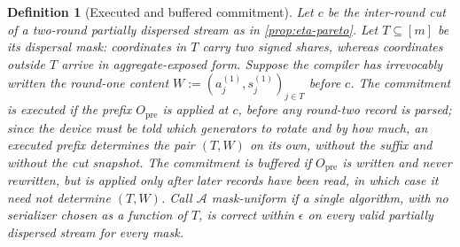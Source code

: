 \documentclass[a4paper,twocolumn,10pt,unpublished]{quantumarticle}
\newtheorem{definition}{Definition}
\begin{document}
\begin{definition}[Executed and buffered commitment]
\label{def:self-identifying}
Let $c$ be the inter-round cut of a two-round partially dispersed stream
as in \cref{prop:eta-pareto}.  Let $T\subseteq[m]$ be its dispersal mask:
coordinates in $T$ carry two signed shares, whereas coordinates outside
$T$ arrive in aggregate-exposed form.  Suppose the compiler has
irrevocably written the round-one content
$W:=(a^{(1)}_j,s^{(1)}_j)_{j\in T}$ before $c$.  The commitment is
\emph{executed} if the prefix $O_{\mathrm{pre}}$ is applied at $c$,
before any round-two record is parsed; since the device must be told
which generators to rotate and by how much, an executed prefix
determines the pair $(T,W)$ on its own, without the suffix and without
the cut snapshot.  The commitment is \emph{buffered} if
$O_{\mathrm{pre}}$ is written and never rewritten, but is applied only
after later records have been read, in which case it need not determine
$(T,W)$.  Call $\mathcal A$ \emph{mask-uniform} if a single algorithm,
with no serializer chosen as a function of $T$, is correct within
$\epsilon$ on every valid partially dispersed stream for every mask.
\end{definition}
\end{document}
